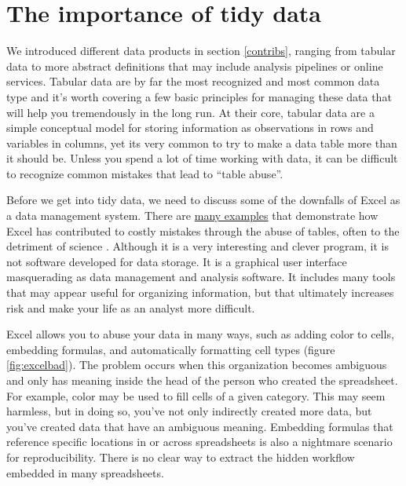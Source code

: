 \documentclass[
]{book}
\begin{document}
\section{The importance of tidy data}\label{whytidy}

We introduced different data products in section \ref{contribs}, ranging from tabular data to more abstract definitions that may include analysis pipelines or online services. Tabular data are by far the most recognized and most common data type and it's worth covering a few basic principles for managing these data that will help you tremendously in the long run. At their core, tabular data are a simple conceptual model for storing information as observations in rows and variables in columns, yet its very common to try to make a data table more than it should be. Unless you spend a lot of time working with data, it can be difficult to recognize common mistakes that lead to ``table abuse''.

Before we get into tidy data, we need to discuss some of the downfalls of Excel as a data management system. There are \href{http://www.eusprig.org/horror-stories.htm}{many examples} that demonstrate how Excel has contributed to costly mistakes through the abuse of tables, often to the detriment of science \citep{Ziemann16}. Although it is a very interesting and clever program, it is not software developed for data storage. It is a graphical user interface masquerading as data management and analysis software. It includes many tools that may appear useful for organizing information, but that ultimately increases risk and make your life as an analyst more difficult.

Excel allows you to abuse your data in many ways, such as adding color to cells, embedding formulas, and automatically formatting cell types (figure \ref{fig:excelbad}). The problem occurs when this organization becomes ambiguous and only has meaning inside the head of the person who created the spreadsheet. For example, color may be used to fill cells of a given category. This may seem harmless, but in doing so, you've not only indirectly created more data, but you've created data that have an ambiguous meaning. Embedding formulas that reference specific locations in or across spreadsheets is also a nightmare scenario for reproducibility. There is no clear way to extract the hidden workflow embedded in many spreadsheets.
\end{document}

